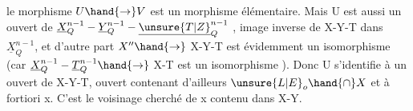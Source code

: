  le morphisme $U\hand{\to} V$ est un morphisme élémentaire. Mais  U est aussi
un ouvert de $\underline{X}^{n-1}_Q - \underline{Y}^{n-1}_Q - \underline{\unsure{T|Z}}^{n-1}_Q$ , image inverse de X-Y-T dans $\underline{X}^{n-1}_Q$,
et d'autre part $X''\hand{\to}$ X-Y-T est évidemment un isomorphisme (car
$\underline{X}^{n-1}_Q - \underline{T}^{n-1}_Q \hand{\to}$ X-T est un isomorphisme ). Donc U s'identifie à un ouvert
de X-Y-T, ouvert contenant d'ailleurs $\unsure{L|E}_o\hand{\cap} X$ et à fortiori x. C'est le
voisinage cherché de x contenu dans X-Y.

